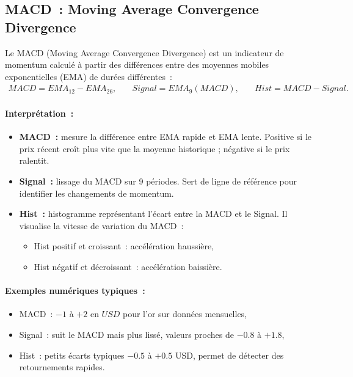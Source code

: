 \documentclass[12pt,a4paper]{article}
\begin{document}
\subsection{MACD~: Moving Average Convergence Divergence}

Le MACD (Moving Average Convergence Divergence) est un indicateur de momentum 
calculé à partir des différences entre des moyennes mobiles exponentielles (EMA) de 
durées différentes~:
\begin{eqnarray}
    MACD    = EMA_{12} - EMA_{26}, &\quad
    Signal  = EMA_9(MACD), &\quad
    Hist    = MACD - Signal.
\end{eqnarray}

\paragraph{Interprétation~:}
\begin{itemize}
    \item \textbf{MACD~:} mesure la différence entre EMA rapide et EMA lente. 
          Positive si le prix récent croît plus vite que la moyenne historique ;
          négative si le prix ralentit.
    \item \textbf{Signal~:} lissage du MACD sur 9 périodes. Sert de ligne de 
          référence pour identifier les changements de momentum.
    \item \textbf{Hist~:} histogramme représentant l'écart entre la MACD et le Signal. 
          Il visualise la vitesse de variation du MACD~: 
          \begin{itemize}
              \item Hist positif et croissant~: accélération haussière,
              \item Hist négatif et décroissant~: accélération baissière.
          \end{itemize}
\end{itemize}

\paragraph{Exemples numériques typiques~:}
\begin{itemize}
    \item MACD~: $-1$ à $+2$ en $USD$ pour l'or sur données mensuelles,
    \item Signal~: suit le MACD mais plus lissé, valeurs proches de $-0.8$ à $+1.8$,
    \item Hist~: petits écarts typiques $-0.5$ à $+0.5$ USD, 
          permet de détecter des retournements rapides.
\end{itemize}
\end{document}
